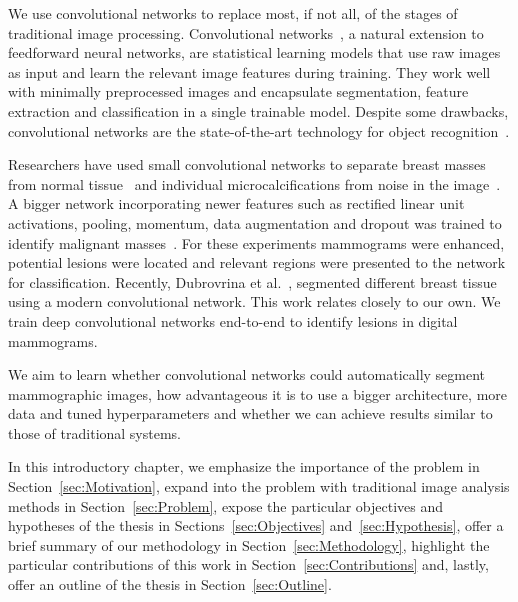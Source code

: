 We use convolutional networks to replace most, if not all, of the stages of traditional image processing. 
Convolutional networks~\cite{Fukushima1980,LeCun1998}, a natural extension to feedforward neural networks, are statistical learning models that use raw images as input and learn the relevant image features during training. They work well with minimally preprocessed images and encapsulate segmentation, feature extraction and classification in a single trainable model. Despite some drawbacks, convolutional networks are the state-of-the-art technology for object recognition~\cite{Russakovsky2015}.

Researchers have used small convolutional networks to separate breast masses from normal tissue~\cite{Sahiner1996} and individual microcalcifications from noise in the image~\cite{Lo1995, Ge2007}. A bigger network incorporating newer features such as rectified linear unit activations, pooling, momentum, data augmentation and dropout was trained to identify malignant masses~\cite{Arevalo2016}. For these experiments mammograms were enhanced, potential lesions were located and relevant regions were presented to the network for classification.
Recently, Dubrovrina et al.~\cite{Dubrovina2015}, segmented different breast tissue using a modern convolutional network. This work relates closely to our own. We train deep convolutional networks end-to-end to identify lesions in digital mammograms.%

We aim to learn whether convolutional networks could automatically segment mammographic images, how advantageous it is to use a bigger architecture, more data and tuned hyperparameters and whether we can achieve results similar to those of traditional systems.

In this introductory chapter, we emphasize the importance of the problem in Section~\ref{sec:Motivation}, expand into the problem with traditional image analysis methods in Section~\ref{sec:Problem}, expose the particular objectives and hypotheses of the thesis in Sections~\ref{sec:Objectives} and~\ref{sec:Hypothesis}, offer a brief summary of our methodology in Section~\ref{sec:Methodology}, highlight the particular contributions of this work in Section~\ref{sec:Contributions} and, lastly, offer an outline of the thesis in Section~\ref{sec:Outline}.
